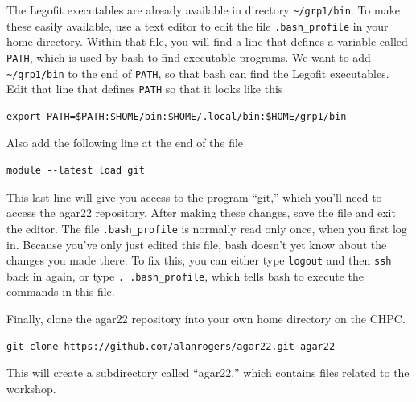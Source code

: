 \documentclass[11pt]{article}
\begin{document}
The Legofit executables are already available in directory
\verb|~/grp1/bin|. To make these easily available, use a text editor
to edit the file \verb|.bash_profile| in your home directory. Within
that file, you will find a line that defines a variable called
\texttt{PATH}, which is used by bash to find executable programs. We
want to add \verb|~/grp1/bin| to the end of \texttt{PATH}, so that
bash can find the Legofit executables. Edit that line that defines
\texttt{PATH} so that it looks like this
\begin{verbatim}
export PATH=$PATH:$HOME/bin:$HOME/.local/bin:$HOME/grp1/bin
\end{verbatim}
Also add the following line at the end of the file
\begin{verbatim}
module --latest load git
\end{verbatim}
This last line will give you access to the program ``git,'' which
you'll need to access the agar22 repository. After making these
changes, save the file and exit the editor. The file
\verb|.bash_profile| is normally read only once, when you first log
in. Because you've only just edited this file, bash doesn't yet know
about the changes you made there. To fix this, you can either type
\texttt{logout} and then \texttt{ssh} back in again, or type
\verb|. .bash_profile|, which tells bash to execute the commands in
this file.

Finally, clone the agar22 repository into your own home directory on
the CHPC.
\begin{verbatim}
git clone https://github.com/alanrogers/agar22.git agar22
\end{verbatim}
This will create a subdirectory called ``agar22,'' which contains
files related to the workshop.
\end{document}
